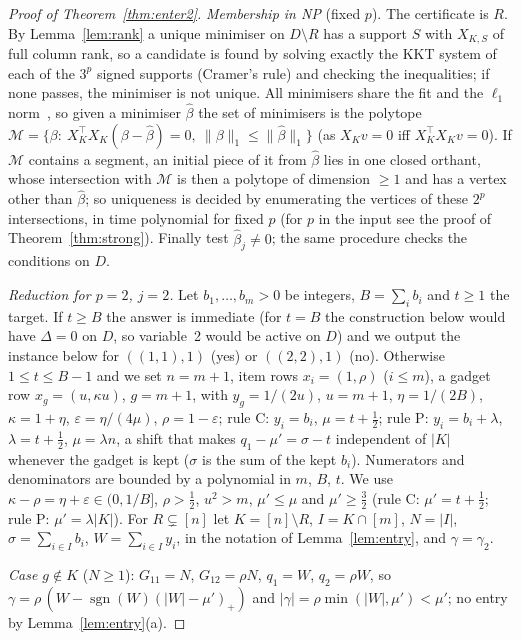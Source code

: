 \documentclass[10pt,a4paper]{article}
\theoremstyle{plain}
\theoremstyle{definition}
\theoremstyle{remark}
\newcommand{\sgn}{\operatorname{sgn}}
\newcommand{\Dm}{D\setminus R}
\begin{document}
\begin{proof}[Proof of Theorem~\ref{thm:enter2}]
\emph{Membership in NP} (fixed $p$). The certificate is $R$. By Lemma~\ref{lem:rank} a unique minimiser on $\Dm$ has a support $S$ with $X_{K,S}$ of full column rank, so a candidate is found by solving exactly the KKT system of each of the $3^p$ signed supports (Cramer's rule) and checking the inequalities; if none passes, the minimiser is not unique. All minimisers share the fit and the $\ell_1$ norm~\citep{tibshirani2013}, so given a minimiser $\hat\beta$ the set of minimisers is the polytope $\mathcal M=\{\beta:\ X_K^{\top}X_K(\beta-\hat\beta)=0,\ \lVert\beta\rVert_1\le\lVert\hat\beta\rVert_1\}$ (as $X_Kv=0$ iff $X_K^{\top}X_Kv=0$). If $\mathcal M$ contains a segment, an initial piece of it from $\hat\beta$ lies in one closed orthant, whose intersection with $\mathcal M$ is then a polytope of dimension $\ge1$ and has a vertex other than $\hat\beta$; so uniqueness is decided by enumerating the vertices of these $2^p$ intersections, in time polynomial for fixed $p$ (for $p$ in the input see the proof of Theorem~\ref{thm:strong}). Finally test $\hat\beta_j\neq0$; the same procedure checks the conditions on $D$.

\emph{Reduction for $p=2$, $j=2$.} Let $b_1,\dots,b_m>0$ be integers, $B=\sum_ib_i$ and $t\ge1$ the target. If $t\ge B$ the answer is immediate (for $t=B$ the construction below would have $\Delta=0$ on $D$, so variable~2 would be active on $D$) and we output the instance below for $((1,1),1)$ (yes) or $((2,2),1)$ (no). Otherwise $1\le t\le B-1$ and we set $n=m+1$, item rows $x_i=(1,\rho)$ ($i\le m$), a gadget row $x_g=(u,\kappa u)$, $g=m+1$, with $y_g=1/(2u)$, $u=m+1$, $\eta=1/(2B)$, $\kappa=1+\eta$, $\varepsilon=\eta/(4\mu)$, $\rho=1-\varepsilon$; rule C: $y_i=b_i$, $\mu=t+\frac12$; rule P: $y_i=b_i+\lambda$, $\lambda=t+\frac12$, $\mu=\lambda n$, a shift that makes $q_1-\mu'=\sigma-t$ independent of $|K|$ whenever the gadget is kept ($\sigma$ is the sum of the kept $b_i$). Numerators and denominators are bounded by a polynomial in $m$, $B$, $t$. We use $\kappa-\rho=\eta+\varepsilon\in(0,1/B]$, $\rho>\frac12$, $u^2>m$, $\mu'\le\mu$ and $\mu'\ge\frac32$ (rule C: $\mu'=t+\frac12$; rule P: $\mu'=\lambda|K|$). For $R\subsetneq[n]$ let $K=[n]\setminus R$, $I=K\cap[m]$, $N=|I|$, $\sigma=\sum_{i\in I}b_i$, $W=\sum_{i\in I}y_i$, in the notation of Lemma~\ref{lem:entry}, and $\gamma=\gamma_2$.

\emph{Case $g\notin K$} ($N\ge1$): $G_{11}=N$, $G_{12}=\rho N$, $q_1=W$, $q_2=\rho W$, so $\gamma=\rho\,(W-\sgn(W)(|W|-\mu')_+)$ and $|\gamma|=\rho\min(|W|,\mu')<\mu'$; no entry by Lemma~\ref{lem:entry}(a).


\end{proof}
\end{document}
